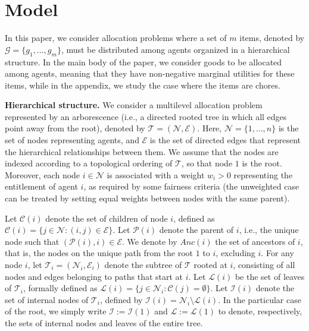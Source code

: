 \documentclass[]{article}
\newcommand{\tree}{\mathcal{T}}
\newcommand{\nodes}{\mathcal{N}}
\newcommand{\edges}{\mathcal{E}}
\newcommand{\items}{\mathcal{G}}
\newcommand{\children}{\mathcal{C}}
\newcommand{\parent}{\mathcal{P}}
\newcommand{\leaves}{\mathcal{L}}
\newcommand{\internal}{\mathcal{I}}
\newcommand{\ancestors}{Anc}
\begin{document}
\section{Model} \label{section: model}

In this paper, we consider allocation problems where a set of $m$ items, denoted by $\items = \{g_1, \ldots, g_m\}$, must be distributed among agents organized in a hierarchical structure. In the main body of the paper, we consider goods to be allocated among agents, meaning that they have non-negative marginal utilities for these items, while in the appendix, we study the case where the items are chores.

\vspace{0.1cm}

\noindent \textbf{Hierarchical structure.} We consider a multilevel allocation problem represented by an arborescence (i.e., a directed rooted tree in which all edges point away from the root), denoted by $\tree = (\nodes, \edges)$. Here, $\nodes = \{1,\ldots,n\}$ is the set of nodes representing agents, and $\edges$ is the set of directed edges that represent the hierarchical relationships between them. We assume that the nodes are indexed according to a topological ordering of $\tree$, so that node $1$ is the root. Moreover, each node $i \in \nodes$ is associated with a weight $w_i > 0$ representing the entitlement of agent $i$, as required by some fairness criteria (the unweighted case can be treated by setting equal weights between nodes with the same parent). 

Let $\children(i)$ denote the set of children of node $i$, defined as $\children(i) = \{j \in \nodes : (i,j) \in \edges\}$. Let $\parent(i)$ denote the parent of $i$, i.e., the unique node such that $(\parent(i), i) \in \edges$. We denote by $\ancestors(i)$ the set of ancestors of $i$, that is, the nodes on the unique path from the root $1$ to $i$, excluding $i$. For any node $i$, let $\tree_i = (\nodes_i, \edges_i)$ denote the subtree of $\tree$ rooted at $i$, consisting of all nodes and edges belonging to paths that start at $i$. Let $\leaves(i)$ be the set of leaves of $\tree_i$, formally defined as $\leaves(i) = \{j \in \nodes_i : \children(j) = \emptyset\}$. Let $\internal(i)$ denote the set of internal nodes of $\tree_i$, defined by $\internal(i) = \nodes_i \setminus \leaves(i)$. In the particular case of the root, we simply write $\internal := \internal(1)$ and $\leaves := \leaves(1)$ to denote, respectively, the sets of internal nodes and leaves of the entire tree.
\end{document}
